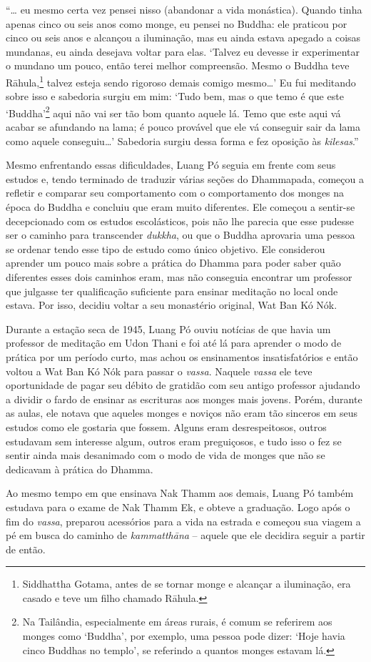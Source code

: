 ``\ldots{} eu mesmo certa vez pensei nisso (abandonar a vida monástica).
Quando tinha apenas cinco ou seis anos como monge, eu pensei no Buddha:
ele praticou por cinco ou seis anos e alcançou a iluminação, mas eu
ainda estava apegado a coisas mundanas, eu ainda desejava voltar para
elas. `Talvez eu devesse ir experimentar o mundano um pouco, então terei
melhor compreensão. Mesmo o Buddha teve Rāhula,\footnote{Siddhattha
  Gotama, antes de se tornar monge e alcançar a iluminação, era casado e
  teve um filho chamado Rāhula.} talvez esteja sendo rigoroso demais
comigo mesmo\ldots{}' Eu fui meditando sobre isso e sabedoria surgiu em
mim: `Tudo bem, mas o que temo é que este `Buddha'\footnote{Na
  Tailândia, especialmente em áreas rurais, é comum se referirem aos
  monges como `Buddha', por exemplo, uma pessoa pode dizer: `Hoje havia
  cinco Buddhas no templo', se referindo a quantos monges estavam lá.}
aqui não vai ser tão bom quanto aquele lá. Temo que este aqui vá acabar
se afundando na lama; é pouco provável que ele vá conseguir sair da lama
como aquele conseguiu\ldots{}' Sabedoria surgiu dessa forma e fez
oposição às \emph{kilesas}.''

Mesmo enfrentando essas dificuldades, Luang Pó seguia em frente com seus
estudos e, tendo terminado de traduzir várias seções do Dhammapada,
começou a refletir e comparar seu comportamento com o comportamento dos
monges na época do Buddha e concluiu que eram muito diferentes. Ele
começou a sentir-se decepcionado com os estudos escolásticos, pois não
lhe parecia que esse pudesse ser o caminho para transcender
\emph{dukkha}, ou que o Buddha aprovaria uma pessoa se ordenar tendo
esse tipo de estudo como único objetivo. Ele considerou aprender um
pouco mais sobre a prática do Dhamma para poder saber quão diferentes
esses dois caminhos eram, mas não conseguia encontrar um professor que
julgasse ter qualificação suficiente para ensinar meditação no local
onde estava. Por isso, decidiu voltar a seu monastério original, Wat Ban
Kó Nók.

Durante a estação seca de 1945, Luang Pó ouviu notícias de que havia um
professor de meditação em Udon Thani e foi até lá para aprender o modo
de prática por um período curto, mas achou os ensinamentos
insatisfatórios e então voltou a Wat Ban Kó Nók para passar o
\emph{vassa}. Naquele \emph{vassa} ele teve oportunidade de pagar seu
débito de gratidão com seu antigo professor ajudando a dividir o fardo
de ensinar as escrituras aos monges mais jovens. Porém, durante as
aulas, ele notava que aqueles monges e noviços não eram tão sinceros em
seus estudos como ele gostaria que fossem. Alguns eram desrespeitosos,
outros estudavam sem interesse algum, outros eram preguiçosos, e tudo
isso o fez se sentir ainda mais desanimado com o modo de vida de monges
que não se dedicavam à prática do Dhamma.

Ao mesmo tempo em que ensinava Nak Thamm aos demais, Luang Pó também
estudava para o exame de Nak Thamm Ek, e obteve a graduação. Logo após o
fim do \emph{vassa}, preparou acessórios para a vida na estrada e
começou sua viagem a pé em busca do caminho de \emph{kammatthāna} --
aquele que ele decidira seguir a partir de então.
